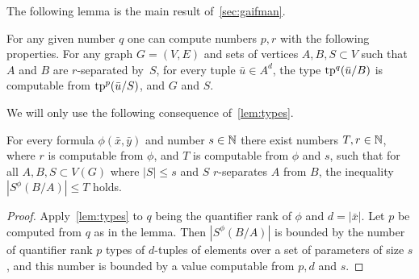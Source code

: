 The following lemma is the main result of~\cref{sec:gaifman}.




\begin{lemma}%
	\label{lem:types}
For any given number $q$
one can compute numbers $p,r$ with the following properties.	For any graph $G=(V,E)$ and sets of vertices $A,B,S\subset V$	
	such that $A$  and $B$ are $r$-separated by~$S$,
	for every tuple $\bar u\in A^{d}$, 
	the type $\mathrm{tp}^q(\bar u/B)$
	is computable from  $\mathrm{tp}^{p}(\bar u/S)$, and $G$ and $S$.
 
  
  
\end{lemma}


We will  only use the following consequence of~\cref{lem:types}.

\begin{corollary}\label{cor:bound}
For every formula $\phi(\bar x,\bar y)$ 
and number $s\in \mathbb{N}$
there exist numbers $T,r\in \mathbb{N}$,
where $r$ is computable from $\phi$, and $T$ is computable from $\phi$ and $s$,
  such that for all $A,B,S\subset V(G)$ 
  where $|S|\le s$ and $S$ $r$-separates $A$ from $B$, the inequality 
  $|S^\phi(B/A)|\le T$ holds.
\end{corollary}
\begin{proof}
 Apply~\cref{lem:types} to $q$ being the quantifier rank of $\phi$ and $d=|\bar x|$. Let 
  $p$ be  computed from $q$ as in the lemma.
 Then $|S^\phi(B/A)|$ is bounded by the number of quantifier rank $p$ types of $d$-tuples of elements over a set of parameters of size $s$, and this number  is bounded by a value computable from $p,d$ and $s$.
\end{proof}




